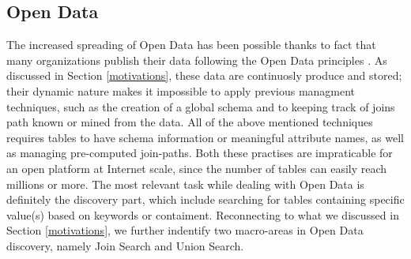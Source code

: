\subsection{Open Data}
The increased spreading of Open Data has been possible thanks to fact that many organizations publish their data following the Open Data principles \cite{bizer2009linked}. As discussed in Section \ref{motivations}, these data are continuosly produce and stored; their dynamic nature makes it impossible to apply previous managment techniques, such as the creation of a global schema \cite{10.1145/27633.27634} and to keeping track of joins path known or mined from the data\cite{fagin2009clio,deng2017data}. All of the above mentioned techniques requires tables to have schema information or meaningful attribute names, as well as managing pre-computed join-paths. Both these practises are impraticable for an open platform at Internet scale, since the number of tables can easily reach millions or more. The most relevant task while dealing with Open Data is definitely the discovery part, which include searching for tables containing specific value(s) based on keywords \cite{brickley2019google} or contaiment. Reconnecting to what we discussed in Section \ref{motivations}, we further indentify two macro-areas in Open Data discovery, namely Join Search and Union Search.
\bigbreak

